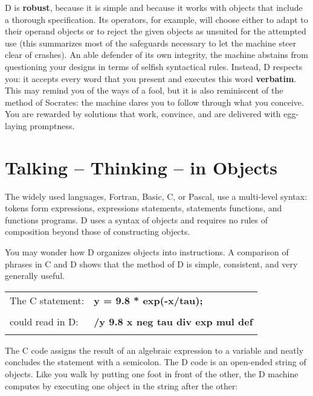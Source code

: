 D is \textbf{robust}, because it is simple and because it works with objects that include a thorough specification.  Its operators,  for example,  will  choose either  to  adapt to their operand objects or to reject the given objects  as unsuited  for  the  attempted  use  (this  summarizes  most  of   the safeguards necessary to let the machine steer clear of crashes). An  able defender of its own integrity, the machine abstains from questioning your designs in terms of selfish syntactical rules. Instead, D respects you:  it  accepts  every  word that you present and  executes  this  word \textbf{verbatim}.  This  may  remind you of the ways of a fool,  but it  is  also reminiscent  of the method of Socrates:  the machine dares you to  follow through  what  you conceive.  You are rewarded by  solutions  that  work, convince, and are delivered with egg-laying promptness.

\section{Talking -- Thinking -- in Objects}

The widely used languages,  Fortran,  Basic,  C, or Pascal, use a multi-level syntax: tokens form expressions, expressions statements, statements functions,  and  functions  programs.  D  uses a syntax  of  objects  and requires no rules of composition beyond those of constructing objects.

You may wonder how D organizes objects into instructions.  A comparison of phrases  in  C and D shows that the  method  of  D  is  simple, consistent, and very generally useful.\\

\begin{tabular}{>{\normalfont}l>{\sffamily\bfseries}l}
The C statement:  & y = 9.8 * exp(-x/tau);\\\\
could read in D:  & /y 9.8 x neg tau div exp mul def\\\\
\end{tabular}

\noindent The  C code assigns the result of an algebraic expression to a variable and neatly concludes the statement with a semicolon.  The D code is an open-ended  string of objects.  Like you walk by putting one foot in front of the other,  the D machine computes by executing one object in the  string after the other:\\

